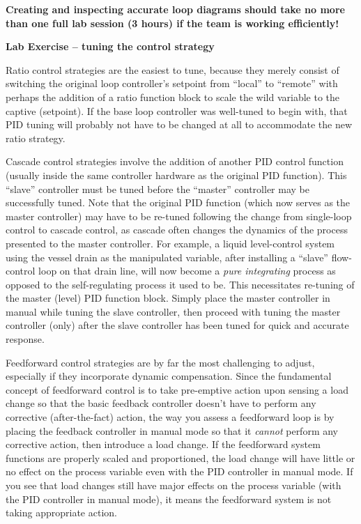 \documentclass[12pt,a4paper]{article}
\begin{document}
\vskip 10pt

{\bf Creating and inspecting accurate loop diagrams should take no more than one full lab session (3 hours) if the team is working efficiently!}






\vfil \eject

\noindent
{\bf Lab Exercise -- tuning the control strategy}

\vskip 5pt

Ratio control strategies are the easiest to tune, because they merely consist of switching the original loop controller's setpoint from ``local'' to ``remote'' with perhaps the addition of a ratio function block to scale the wild variable to the captive (setpoint).  If the base loop controller was well-tuned to begin with, that PID tuning will probably not have to be changed at all to accommodate the new ratio strategy.

\vskip 10pt

Cascade control strategies involve the addition of another PID control function (usually inside the same controller hardware as the original PID function).  This ``slave'' controller must be tuned before the ``master'' controller may be successfully tuned.  Note that the original PID function (which now serves as the master controller) may have to be re-tuned following the change from single-loop control to cascade control, as cascade often changes the dynamics of the process presented to the master controller.  For example, a liquid level-control system using the vessel drain as the manipulated variable, after installing a ``slave'' flow-control loop on that drain line, will now become a {\it pure integrating} process as opposed to the self-regulating process it used to be.  This necessitates re-tuning of the master (level) PID function block.  Simply place the master controller in manual while tuning the slave controller, then proceed with tuning the master controller (only) after the slave controller has been tuned for quick and accurate response.

\vskip 10pt

Feedforward control strategies are by far the most challenging to adjust, especially if they incorporate dynamic compensation.  Since the fundamental concept of feedforward control is to take pre-emptive action upon sensing a load change so that the basic feedback controller doesn't have to perform any corrective (after-the-fact) action, the way you assess a feedforward loop is by placing the feedback controller in manual mode so that it {\it cannot} perform any corrective action, then introduce a load change.  If the feedforward system functions are properly scaled and proportioned, the load change will have little or no effect on the process variable even with the PID controller in manual mode.  If you see that load changes still have major effects on the process variable (with the PID controller in manual mode), it means the feedforward system is not taking appropriate action.
\end{document}
